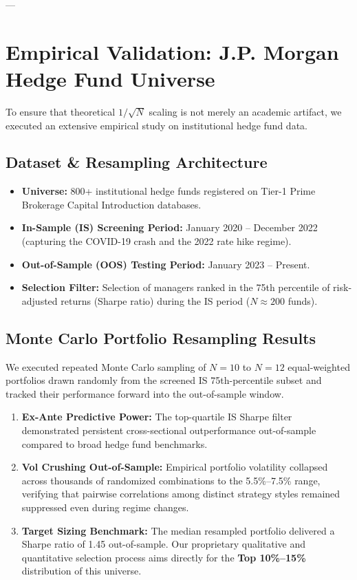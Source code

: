 \documentclass[11pt,a4paper]{article}
\begin{document}
---

\section{Empirical Validation: J.P. Morgan Hedge Fund Universe}

To ensure that theoretical $1/\sqrt{N}$ scaling is not merely an academic artifact, we executed an extensive empirical study on institutional hedge fund data.

\subsection{Dataset \& Resampling Architecture}
\begin{itemize}[leftmargin=1.5em, itemsep=0.3em]
    \item \textbf{Universe:} 800+ institutional hedge funds registered on Tier-1 Prime Brokerage Capital Introduction databases.
    \item \textbf{In-Sample (IS) Screening Period:} January 2020 -- December 2022 (capturing the COVID-19 crash and the 2022 rate hike regime).
    \item \textbf{Out-of-Sample (OOS) Testing Period:} January 2023 -- Present.
    \item \textbf{Selection Filter:} Selection of managers ranked in the 75th percentile of risk-adjusted returns (Sharpe ratio) during the IS period ($N \approx 200$ funds).
\end{itemize}

\subsection{Monte Carlo Portfolio Resampling Results}
We executed repeated Monte Carlo sampling of $N=10$ to $N=12$ equal-weighted portfolios drawn randomly from the screened IS 75th-percentile subset and tracked their performance forward into the out-of-sample window.

\begin{calloutbox}[title=Key Findings from Out-of-Sample Testing]
\begin{enumerate}[leftmargin=1.2em, itemsep=0.2em]
    \item \textbf{Ex-Ante Predictive Power:} The top-quartile IS Sharpe filter demonstrated persistent cross-sectional outperformance out-of-sample compared to broad hedge fund benchmarks.
    \item \textbf{Vol Crushing Out-of-Sample:} Empirical portfolio volatility collapsed across thousands of randomized combinations to the 5.5\%--7.5\% range, verifying that pairwise correlations among distinct strategy styles remained suppressed even during regime changes.
    \item \textbf{Target Sizing Benchmark:} The median resampled portfolio delivered a Sharpe ratio of 1.45 out-of-sample. Our proprietary qualitative and quantitative selection process aims directly for the \textbf{Top 10\%--15\%} distribution of this universe.
\end{enumerate}
\end{calloutbox}
\end{document}
